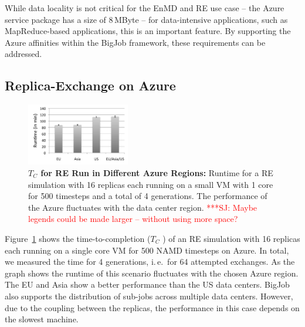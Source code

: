 \documentclass[conference,final]{IEEEtran}
\newcommand{\up}{\vspace*{-1em}}
\newcommand{\tc}{$T_{C}$ }
\newcommand{\jhanote}[1]{ {\textcolor{red} { ***SJ: #1 }}}
\newcommand{\jhanote}[1]{}
\begin{document}

While data locality is not critical for the EnMD and RE use case --
the Azure service package has a size of 8\,MByte -- for data-intensive
applications, such as MapReduce-based applications, this is an
important feature. By supporting the Azure affinities within the
BigJob framework, these requirements can be addressed.  \up

\subsection{Replica-Exchange on Azure}
\up
\begin{figure}[t]
    \centering
        \includegraphics[width=0.4\textwidth]{performance/repex_runtime_per_region.pdf}
        \up
        \caption{\textbf{\tc for RE Run in Different Azure Regions:}
          Runtime for a RE simulation with 16 replicas each running on
          a small VM with 1 core for 500 timesteps and a total of 4
          generations. The performance of the Azure fluctuates with
          the data center region. \jhanote{Maybe legends could be made
            larger -- without using more space?}\up}
    \label{fig:performance_repex_runtime_per_region}
    \up
\end{figure}

Figure~\ref{fig:performance_repex_runtime_per_region} shows the
time-to-completion (\tc) of an RE simulation with 16 replicas each
running on a single core VM for 500 NAMD timesteps on Azure. In total,
we measured the time for 4 generations, i.\,e.\ for 64 attempted
exchanges. As the graph shows the runtime of this scenario fluctuates
with the chosen Azure region. The EU and Asia show a better
performance than the US data centers. BigJob also supports the
distribution of sub-jobs across multiple data centers. However, due to
the coupling between the replicas, the performance in this case
depends on the slowest machine.
\end{document}
